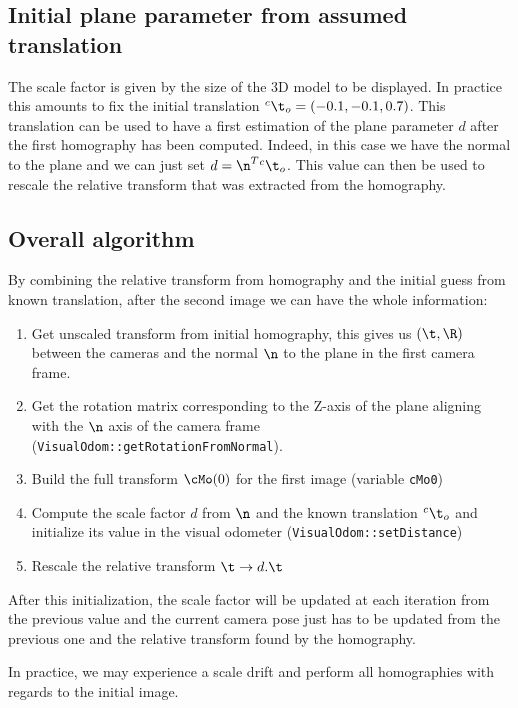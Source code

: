 \documentclass{ecnreport}
\begin{document}
\subsection{Initial plane parameter from assumed translation}
\label{sec:init}

The scale factor is given by the size of the 3D model to be displayed. In practice this amounts to fix the initial translation ${}^c\t_o = (-0.1,-0.1,0.7)$.
This translation can be used to have a first estimation of the plane parameter $d$ after the first homography has been computed.
Indeed, in this case we have the normal to the plane and we can just set $d = \n^T{}^c\t_o$. This value can then be used to rescale the relative transform 
that was extracted from the homography. 

\subsection{Overall algorithm}

By combining the relative transform from homography and the initial guess from known translation, after the second image we can have the whole information:
\begin{enumerate}
 \item Get unscaled transform from initial homography, this gives us $(\t,\R)$ between the cameras and the normal $\n$ to the plane in the first camera frame.
 \item Get the rotation matrix corresponding to the Z-axis of the plane aligning with the $\n$ axis of the camera frame (\texttt{VisualOdom::getRotationFromNormal}). 
 \item Build the full transform $\cMo(0)$ for the first image (variable \texttt{cMo0})
  \item Compute the scale factor $d$ from $\n$ and the known translation ${}^c\t_o$ and initialize its value in the visual odometer (\texttt{VisualOdom::setDistance})
  \item Rescale the relative transform $\t \rightarrow d.\t$
\end{enumerate}

After this initialization, the scale factor will be updated at each iteration from the previous value and the current camera pose just has to be updated from the previous one and the relative
transform found by the homography.

In practice, we may experience a scale drift and perform all homographies with regards to the initial image.
\end{document}
